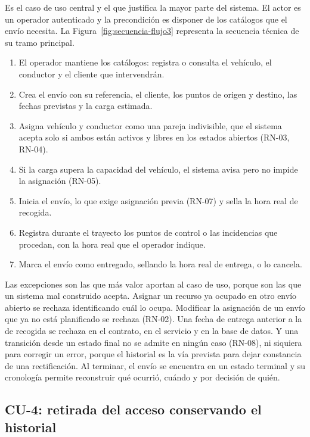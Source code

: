 Es el caso de uso central y el que justifica la mayor parte del sistema. El actor es un operador autenticado y la precondición es disponer de los catálogos que el envío necesita. La Figura~\ref{fig:secuencia-flujo3} representa la secuencia técnica de su tramo principal.

\begin{enumerate}
  \item El operador mantiene los catálogos: registra o consulta el vehículo, el conductor y el cliente que intervendrán.
  \item Crea el envío con su referencia, el cliente, los puntos de origen y destino, las fechas previstas y la carga estimada.
  \item Asigna vehículo y conductor como una pareja indivisible, que el sistema acepta solo si ambos están activos y libres en los estados abiertos (RN-03, RN-04).
  \item Si la carga supera la capacidad del vehículo, el sistema avisa pero no impide la asignación (RN-05).
  \item Inicia el envío, lo que exige asignación previa (RN-07) y sella la hora real de recogida.
  \item Registra durante el trayecto los puntos de control o las incidencias que procedan, con la hora real que el operador indique.
  \item Marca el envío como entregado, sellando la hora real de entrega, o lo cancela.
\end{enumerate}

Las excepciones son las que más valor aportan al caso de uso, porque son las que un sistema mal construido acepta. Asignar un recurso ya ocupado en otro envío abierto se rechaza identificando cuál lo ocupa. Modificar la asignación de un envío que ya no está planificado se rechaza (RN-02). Una fecha de entrega anterior a la de recogida se rechaza en el contrato, en el servicio y en la base de datos. Y una transición desde un estado final no se admite en ningún caso (RN-08), ni siquiera para corregir un error, porque el historial es la vía prevista para dejar constancia de una rectificación. Al terminar, el envío se encuentra en un estado terminal y su cronología permite reconstruir qué ocurrió, cuándo y por decisión de quién.

\subsection*{CU-4: retirada del acceso conservando el historial}

